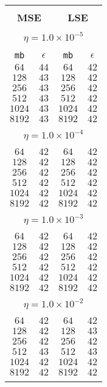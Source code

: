 \documentclass[10pt]{article}
\begin{document}
\begin{center}
\begin{table}[]
\begin{center}
\begin{tabular}{@{}cc|cc@{}}
\hline\\[-11pt]
\hline\\[-6.5pt]
\multicolumn{2}{c}{\bf MSE} & \multicolumn{2}{c}{\bf LSE } \\[5pt]
\hline\\[-11pt]
\multicolumn{4}{c}{$\eta = 1.0\times 10^{-5}$} \\[5pt]
\hline\\[-11pt]
\texttt{mb} & \texttt{$\epsilon$} & \texttt{mb} & \texttt{$\epsilon$} \\[1pt]
$64$ & $44$  & $64$ & $42$ \\ [1pt]
$128$ & $43$   & $128$ & $42$ \\ [1pt]
$256$ & $43$   & $256$ & $42$ \\ [1pt]
$512$ & $43$   & $512$ & $42$ \\ [1pt]
$1024$ & $43$  & $1024$ & $42$ \\ [1pt]
$8192$ & $43$  & $8192$ & $42$ \\ [1pt]
\hline\\[-11pt]
\multicolumn{4}{c}{$\eta = 1.0\times 10^{-4}$} \\[5pt]
\hline\\[-11pt]
$64$ & $42$   & $64$ & $42$ \\ [1pt]
$128$ & $42$  & $128$ & $42$ \\ [1pt]
$256$ & $42$  & $256$ & $42$ \\ [1pt]
$512$ & $42$  & $512$ & $42$ \\ [1pt]
$1024$ & $42$  & $1024$ & $42$ \\ [1pt]
$8192$ & $42$  & $8192$ & $42$ \\ [1pt]
\hline\\[-11pt]
\multicolumn{4}{c}{$\eta = 1.0\times 10^{-3}$} \\[5pt]
\hline\\[-11pt]
$64$ & $42$  & $64$ & $42$ \\ [1pt]
$128$ & $42$   & $128$ & $42$ \\ [1pt]
$256$ & $42$   & $256$ & $42$ \\ [1pt]
$512$ & $42$   & $512$ & $42$ \\ [1pt]
$1024$ & $42$  & $1024$ & $42$ \\ [1pt]
$8192$ & $42$  & $8192$ & $42$ \\ [1pt]
\hline\\[-11pt]

\multicolumn{4}{c}{$\eta = 1.0\times 10^{-2}$} \\[5pt]
\hline\\[-11pt]
$64$ & $42$  & $64$ & $42$ \\ [1pt]
$128$ & $42$  & $128$ & $43$ \\ [1pt]
$256$ & $42$  & $256$ & $42$ \\ [1pt]
$512$ & $43$  & $512$ & $43$ \\ [1pt]
$1024$ & $42$  & $1024$ & $42$ \\ [1pt] 
$8192$ & $42$  & $8192$ & $42$ \\ [1pt] 
\hline\\[-11pt]


\end{tabular}
\end{center}
\end{table}
\end{center}
\end{document}
